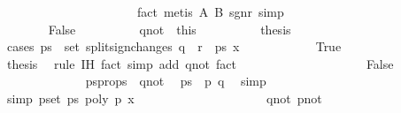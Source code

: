 \begin{isabellebody}
\ \ \ \ \ \ \ \ \ \ \ \ \ \ \ \ \ \ \ \ \ \ fact{\isacharcomma}\ metis\ A\ B\ sgn{\isacharunderscore}r{\isacharprime}{\isacharcomma}\ simp{\isacharparenright}\isanewline
\ \ \ \ \ \ \ \ \ \ \ \ \isamarkupfalse%
\isanewline
\ \ \ \ \ \ \ \ \isamarkupfalse%
\isanewline
\ \ \ \ \isamarkupfalse%
\isanewline
\ \ \ \ \ \ \isamarkupfalse%
\ False\isanewline
\ \ \ \ \ \ \ \ \isamarkupfalse%
\ q{\isacharunderscore}not{\isacharunderscore}{}\ {\isacharequal}\ this\isanewline
\ \ \ \ \ \ \ \ \isamarkupfalse%
\ {\isacharquery}thesis\isanewline
\ \ \ \ \ \ \ \ \isamarkupfalse%
\ {\isacharparenleft}cases\ {\isachardoublequoteopen}ps{\isacharprime}\ {\isasymin}\ set\ {\isacharparenleft}split{\isacharunderscore}sign{\isacharunderscore}changes\ {\isacharparenleft}q\ {\isacharhash}\ r\ {\isacharhash}\ ps{\isacharprime}{\isacharprime}{\isacharparenright}\ x\isanewline
\ \ \ \ \ \ \ \ \ \ \isamarkupfalse%
\ True\isanewline
\ \ \ \ \ \ \ \ \ \ \ \ \isamarkupfalse%
\ {\isacharquery}thesis\ \isamarkupfalse%
\ {\isacharparenleft}rule\ IH{\isacharparenleft}{}{\isacharparenright}{\isacharcomma}\ fact{\isacharcomma}\ simp\ add{\isacharcolon}\ q{\isacharunderscore}not{\isacharunderscore}{}{\isacharcomma}\ fact{\isacharparenright}\isanewline
\ \ \ \ \ \ \ \ \isamarkupfalse%
\isanewline
\ \ \ \ \ \ \ \ \ \ \isamarkupfalse%
\ False\isanewline
\ \ \ \ \ \ \ \ \ \ \ \ \isamarkupfalse%
\ ps{\isacharprime}{\isacharprime}{\isacharunderscore}props\ \ q{\isacharunderscore}not{\isacharunderscore}{}\ \isamarkupfalse%
\ {\isachardoublequoteopen}ps{\isacharprime}\ {\isacharequal}\ {\isacharbrackleft}p{\isacharcomma}\ q{\isacharbrackright}{\isachardoublequoteclose}\ \isamarkupfalse%
\ simp\isanewline
\ \ \ \ \ \ \ \ \ \ \ \ \isamarkupfalse%
\ {\isacharbrackleft}simp{\isacharbrackright}{\isacharcolon}\ {\isachardoublequoteopen}{\isasymforall}p{\isasymin}set\ ps{\isacharprime}{\isachardot}\ poly\ p\ x\ {\isasymnoteq}\ {}{\isachardoublequoteclose}\ \isanewline
\ \ \ \ \ \ \ \ \ \ \ \ \ \ \ \ \isamarkupfalse%
\ q{\isacharunderscore}not{\isacharunderscore}{}\ p{\isacharunderscore}not{\isacharunderscore}{}\ \isamarkupfalse%

\end{isabellebody}
